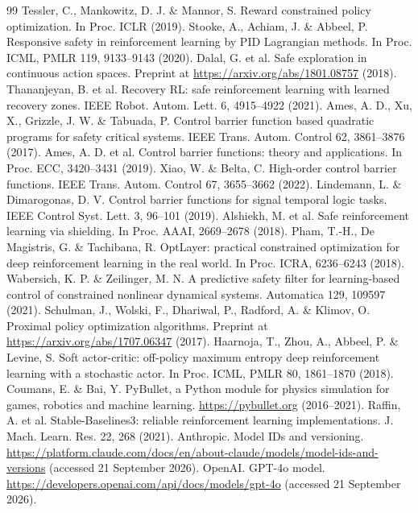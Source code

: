 \documentclass[12pt]{article}
\begin{document}
\begin{thebibliography}{99}
 Tessler, C., Mankowitz, D. J. \& Mannor, S. Reward constrained policy optimization. In Proc. ICLR (2019).
 Stooke, A., Achiam, J. \& Abbeel, P. Responsive safety in reinforcement learning by PID Lagrangian methods. In Proc. ICML, PMLR 119, 9133--9143 (2020).
 Dalal, G. et al. Safe exploration in continuous action spaces. Preprint at \url{https://arxiv.org/abs/1801.08757} (2018).
 Thananjeyan, B. et al. Recovery RL: safe reinforcement learning with learned recovery zones. IEEE Robot. Autom. Lett. 6, 4915--4922 (2021).
 Ames, A. D., Xu, X., Grizzle, J. W. \& Tabuada, P. Control barrier function based quadratic programs for safety critical systems. IEEE Trans. Autom. Control 62, 3861--3876 (2017).
 Ames, A. D. et al. Control barrier functions: theory and applications. In Proc. ECC, 3420--3431 (2019).
 Xiao, W. \& Belta, C. High-order control barrier functions. IEEE Trans. Autom. Control 67, 3655--3662 (2022).
 Lindemann, L. \& Dimarogonas, D. V. Control barrier functions for signal temporal logic tasks. IEEE Control Syst. Lett. 3, 96--101 (2019).
 Alshiekh, M. et al. Safe reinforcement learning via shielding. In Proc. AAAI, 2669--2678 (2018).
 Pham, T.-H., De Magistris, G. \& Tachibana, R. OptLayer: practical constrained optimization for deep reinforcement learning in the real world. In Proc. ICRA, 6236--6243 (2018).
 Wabersich, K. P. \& Zeilinger, M. N. A predictive safety filter for learning-based control of constrained nonlinear dynamical systems. Automatica 129, 109597 (2021).
 Schulman, J., Wolski, F., Dhariwal, P., Radford, A. \& Klimov, O. Proximal policy optimization algorithms. Preprint at \url{https://arxiv.org/abs/1707.06347} (2017).
 Haarnoja, T., Zhou, A., Abbeel, P. \& Levine, S. Soft actor-critic: off-policy maximum entropy deep reinforcement learning with a stochastic actor. In Proc. ICML, PMLR 80, 1861--1870 (2018).
 Coumans, E. \& Bai, Y. PyBullet, a Python module for physics simulation for games, robotics and machine learning. \url{https://pybullet.org} (2016--2021).
 Raffin, A. et al. Stable-Baselines3: reliable reinforcement learning implementations. J. Mach. Learn. Res. 22, 268 (2021).
 Anthropic. Model IDs and versioning. \url{https://platform.claude.com/docs/en/about-claude/models/model-ids-and-versions} (accessed 21 September 2026).
 OpenAI. GPT-4o model. \url{https://developers.openai.com/api/docs/models/gpt-4o} (accessed 21 September 2026).

\end{thebibliography}
\end{document}
